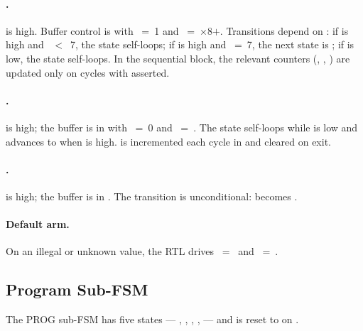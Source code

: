 \paragraph{.}
 is high. Buffer control is
 with ~=~1 and
~=~\(\times\)8\(+\).
Transitions depend on :
if  is high and ~\(<\)~7, the state
self-loops; if  is high and ~=~7, the
next state is ; if  is low, the state
self-loops. In the sequential block, the relevant counters
(, , )
are updated only on cycles with  asserted.

\paragraph{.}
 is high; the buffer is in  with
~=~0 and ~=~.
The state self-loops while  is low and advances to
 when  is high. 
is incremented each cycle in  and cleared on exit.

\paragraph{.}
 is high; the buffer is in . The
transition is unconditional:  becomes
.

\paragraph{Default arm.}
On an illegal or unknown  value, the RTL drives
~=~ and
~=~.

\subsection{Program Sub-FSM}
\label{sec:rtl-controller-prog}

The PROG sub-FSM has five states --- , ,
, ,  --- and is
reset to  on .

